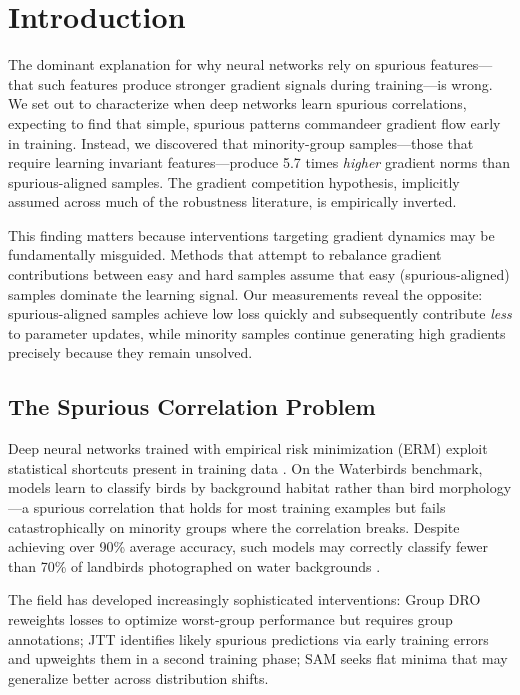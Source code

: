 \section{Introduction}

The dominant explanation for why neural networks rely on spurious features---that such features produce stronger gradient signals during training---is wrong. We set out to characterize when deep networks learn spurious correlations, expecting to find that simple, spurious patterns commandeer gradient flow early in training. Instead, we discovered that minority-group samples---those that require learning invariant features---produce 5.7 times \emph{higher} gradient norms than spurious-aligned samples. The gradient competition hypothesis, implicitly assumed across much of the robustness literature, is empirically inverted.

This finding matters because interventions targeting gradient dynamics may be fundamentally misguided. Methods that attempt to rebalance gradient contributions between easy and hard samples assume that easy (spurious-aligned) samples dominate the learning signal. Our measurements reveal the opposite: spurious-aligned samples achieve low loss quickly and subsequently contribute \emph{less} to parameter updates, while minority samples continue generating high gradients precisely because they remain unsolved.

\subsection{The Spurious Correlation Problem}

Deep neural networks trained with empirical risk minimization (ERM) exploit statistical shortcuts present in training data \citep{sagawa2020distributionally}. On the Waterbirds benchmark, models learn to classify birds by background habitat rather than bird morphology---a spurious correlation that holds for most training examples but fails catastrophically on minority groups where the correlation breaks. Despite achieving over 90\% average accuracy, such models may correctly classify fewer than 70\% of landbirds photographed on water backgrounds \citep{sagawa2020distributionally}.

The field has developed increasingly sophisticated interventions: Group DRO \citep{sagawa2020distributionally} reweights losses to optimize worst-group performance but requires group annotations; JTT \citep{liu2021just} identifies likely spurious predictions via early training errors and upweights them in a second training phase; SAM \citep{Foret2021Sharpness} seeks flat minima that may generalize better across distribution shifts.

